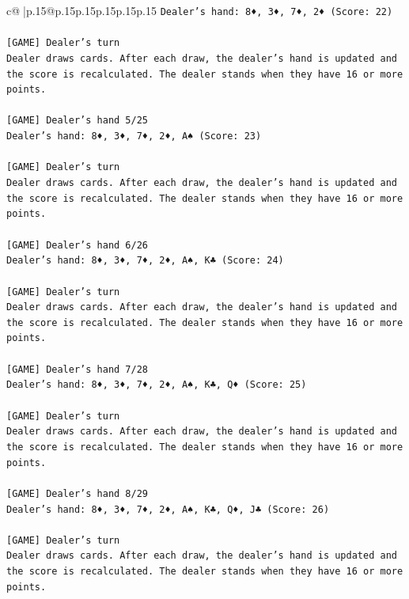 \documentclass{article}
\begin{document}
{\begin{supertabular}{c@{$\;$}|p{.15\linewidth}@{}p{.15\linewidth}p{.15\linewidth}p{.15\linewidth}p{.15\linewidth}p{.15\linewidth}}
{{{\texttt{Dealer's hand: 8♦, 3♦, 7♦, 2♦ (Score: 22)} \\
\\ 
\texttt{{[}GAME{]} Dealer's turn} \\
\texttt{Dealer draws cards. After each draw, the dealer's hand is updated and the score is recalculated. The dealer stands when they have 16 or more points.} \\
\\ 
\texttt{{[}GAME{]} Dealer's hand 5/25} \\
\texttt{Dealer's hand: 8♦, 3♦, 7♦, 2♦, A♠ (Score: 23)} \\
\\ 
\texttt{{[}GAME{]} Dealer's turn} \\
\texttt{Dealer draws cards. After each draw, the dealer's hand is updated and the score is recalculated. The dealer stands when they have 16 or more points.} \\
\\ 
\texttt{{[}GAME{]} Dealer's hand 6/26} \\
\texttt{Dealer's hand: 8♦, 3♦, 7♦, 2♦, A♠, K♣ (Score: 24)} \\
\\ 
\texttt{{[}GAME{]} Dealer's turn} \\
\texttt{Dealer draws cards. After each draw, the dealer's hand is updated and the score is recalculated. The dealer stands when they have 16 or more points.} \\
\\ 
\texttt{{[}GAME{]} Dealer's hand 7/28} \\
\texttt{Dealer's hand: 8♦, 3♦, 7♦, 2♦, A♠, K♣, Q♦ (Score: 25)} \\
\\ 
\texttt{{[}GAME{]} Dealer's turn} \\
\texttt{Dealer draws cards. After each draw, the dealer's hand is updated and the score is recalculated. The dealer stands when they have 16 or more points.} \\
\\ 
\texttt{{[}GAME{]} Dealer's hand 8/29} \\
\texttt{Dealer's hand: 8♦, 3♦, 7♦, 2♦, A♠, K♣, Q♦, J♣ (Score: 26)} \\
\\ 
\texttt{{[}GAME{]} Dealer's turn} \\
\texttt{Dealer draws cards. After each draw, the dealer's hand is updated and the score is recalculated. The dealer stands when they have 16 or more points.} \\
}}}
\end{supertabular}}
\end{document}
